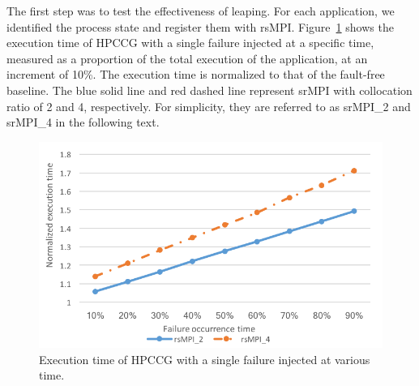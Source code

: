 The first step was to test the effectiveness of leaping. For each application, we identified the process state and register them with rsMPI. Figure~\ref{fig:single_failure} shows the execution time of HPCCG with a single failure injected at a specific time, measured as a proportion of the total execution of the application, at an increment of 10\%.
The execution time is normalized to that of the fault-free baseline.   
The blue solid line and red dashed line represent srMPI with collocation ratio of 2 and 4, respectively. For simplicity, they are referred to as srMPI\_2 and srMPI\_4 in the following text.  

\begin{figure}[!t]
  \begin{center}
      \includegraphics[width=\columnwidth]{figures/single_failure_2}
  \end{center}
  \caption{Execution time of HPCCG with a single failure injected at various time.}
  \label{fig:single_failure}
\vspace{-0.1in}
\end{figure}

